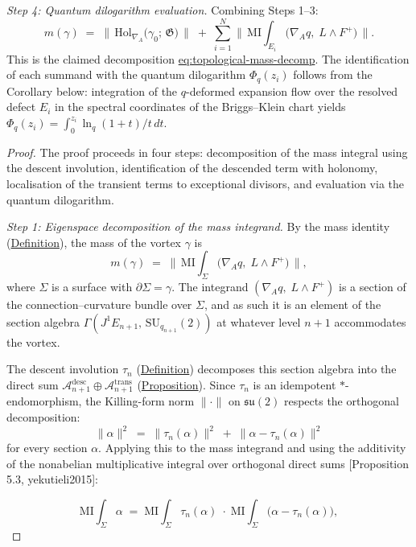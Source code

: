 \begin{theorem}
\emph{Step 4: Quantum dilogarithm evaluation.}
Combining Steps 1--3:
\[
m(\gamma)
  \;=\;
  \bigl\lVert\,
  \mathrm{Hol}_{\nabla_A}\!\bigl(\gamma_0;\, \mathfrak{G}\bigr)
  \,\bigr\rVert
  \;+\;
  \sum_{i=1}^{N}
  \bigl\lVert\,
  \mathrm{MI}\!\!\int_{E_i}
  \bigl(\nabla_A q,\; L \wedge F^+\bigr)
  \,\bigr\rVert.
\]
This is the claimed decomposition \hyperref[eq:topological-mass-decomp]{eq:topological-mass-decomp}.
The identification of each summand with the quantum dilogarithm
$\Phi_q(z_i)$ follows from the Corollary below: integration of the
$q$-deformed expansion flow over the resolved defect $E_i$ in the
spectral coordinates of the Briggs--Klein chart yields
$\Phi_q(z_i) = \int_0^{z_i} \ln_q(1+t)/t\, dt$.
\end{theorem}
\begin{proof}
The proof proceeds in four steps: decomposition of the mass integral
using the descent involution, identification of the descended term with
holonomy, localisation of the transient terms to exceptional divisors,
and evaluation via the quantum dilogarithm.

\emph{Step 1: Eigenspace decomposition of the mass integrand.}
By the mass identity (\hyperref[def:mass-identity]{Definition}), the mass of
the vortex $\gamma$ is
\[
m(\gamma)
  \;=\;
  \bigl\lVert\,
  \mathrm{MI}\!\!\int_\Sigma
  \bigl(\nabla_A q,\; L \wedge F^+\bigr)
  \,\bigr\rVert,
\]
where $\Sigma$ is a surface with $\partial\Sigma = \gamma$.  The
integrand $(\nabla_A q,\; L \wedge F^+)$ is a section of the
connection--curvature bundle over $\Sigma$, and as such it is an element
of the section algebra $\Gamma(J^1 E_{n+1},\, \mathrm{SU}_{q_{n+1}}(2))$
at whatever level $n{+}1$ accommodates the vortex.

The descent involution $\tau_n$ (\hyperref[def:descent-involution]{Definition})
decomposes this section algebra into the direct sum
$\mathcal{A}_{n+1}^{\mathrm{desc}} \oplus \mathcal{A}_{n+1}^{\mathrm{trans}}$
(\hyperref[prop:descent-eigenspaces]{Proposition}).  Since $\tau_n$ is an
idempotent $*$-endomorphism, the Killing-form norm
$\lVert\cdot\rVert$ on $\mathfrak{su}(2)$ respects the orthogonal
decomposition:
\[
\lVert \alpha \rVert^2
  \;=\;
  \lVert \tau_n(\alpha) \rVert^2
  \;+\;
  \lVert \alpha - \tau_n(\alpha) \rVert^2
\]
for every section $\alpha$.  Applying this to the mass integrand and
using the additivity of the nonabelian multiplicative integral over
orthogonal direct sums [Proposition 5.3, yekutieli2015]:

\begin{equation}\label{eq:mi-decomp}
  \mathrm{MI}\!\!\int_\Sigma \alpha
  \;=\;
  \mathrm{MI}\!\!\int_\Sigma \tau_n(\alpha)
  \;\cdot\;
  \mathrm{MI}\!\!\int_\Sigma
  \bigl(\alpha - \tau_n(\alpha)\bigr),
\end{equation}


\end{proof}
